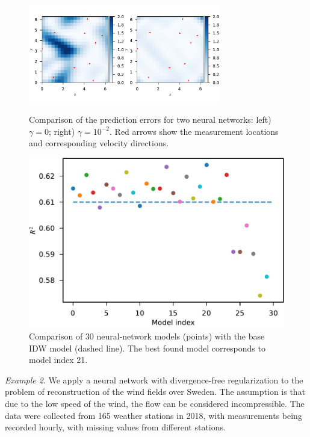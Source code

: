 \documentclass[pamm,a4paper,fleqn]{w-art}
\begin{document}
\begin{figure}
\begin{minipage}{0.48\textwidth}
  \includegraphics[width=3.3in]{assets/error-fields-comparison.pdf}
  \caption{Comparison of the prediction errors for two neural networks:
    left) $\gamma=0$; right) $\gamma=10^{-2}$.
    Red arrows show the measurement locations and corresponding
  velocity directions.}%
  \label{fig:tg2d}
\end{minipage}
\hfill
\begin{minipage}{0.48\textwidth}
  \centering
  \includegraphics[scale=0.42]{assets/r2-vs-model.pdf}
  \caption{Comparison of 30 neural-network models (points)
    with the base IDW model (dashed line).
  The best found model corresponds to model index 21.}%
  \label{fig:r2-vs-model}
\end{minipage}
\end{figure}

\emph{Example 2}.
We apply a neural network with divergence-free regularization to the problem of
reconstruction of the wind fields over Sweden.
The assumption is that due to the low speed of the wind, the flow can be
considered incompressible.
The data were collected from 165 weather stations in 2018, with measurements
being recorded hourly, with missing values from different stations.
\end{document}
